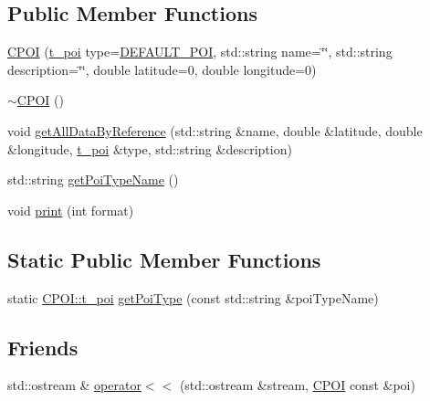 \subsection*{Public Member Functions}
\begin{DoxyCompactItemize}
\item 
\hyperlink{classCPOI_a9dd1c6e7b2a3e82ca3a383cc0a02bf8d}{C\+P\+OI} (\hyperlink{classCPOI_a4b95e2e14055d2f9ca134e474dd4a19f}{t\+\_\+poi} type=\hyperlink{classCPOI_a4b95e2e14055d2f9ca134e474dd4a19fa2c7961f7a81e01841006025f0653b0f0}{D\+E\+F\+A\+U\+L\+T\+\_\+\+P\+OI}, std\+::string name=\char`\"{}\char`\"{}, std\+::string description=\char`\"{}\char`\"{}, double latitude=0, double longitude=0)
\item 
\hyperlink{classCPOI_a8fc284c7b62be827e11f7e8ae443c55f}{$\sim$\+C\+P\+OI} ()
\item 
void \hyperlink{classCPOI_a65c0161ce80d49cf5f2fe80765bc94d9}{get\+All\+Data\+By\+Reference} (std\+::string \&name, double \&latitude, double \&longitude, \hyperlink{classCPOI_a4b95e2e14055d2f9ca134e474dd4a19f}{t\+\_\+poi} \&type, std\+::string \&description)
\item 
std\+::string \hyperlink{classCPOI_a908fcdd7b79aca230c67c05bf1b1a78c}{get\+Poi\+Type\+Name} ()
\item 
void \hyperlink{classCPOI_a2b65d12e722c89a8a105620726195d10}{print} (int format)
\end{DoxyCompactItemize}
\subsection*{Static Public Member Functions}
\begin{DoxyCompactItemize}
\item 
static \hyperlink{classCPOI_a4b95e2e14055d2f9ca134e474dd4a19f}{C\+P\+O\+I\+::t\+\_\+poi} \hyperlink{classCPOI_ac100f8c90fe0e5057e6fa4eca53126ad}{get\+Poi\+Type} (const std\+::string \&poi\+Type\+Name)
\end{DoxyCompactItemize}
\subsection*{Friends}
\begin{DoxyCompactItemize}
\item 
std\+::ostream \& \hyperlink{classCPOI_ad0c53792637fc266cb40d31e21c8a68f}{operator$<$$<$} (std\+::ostream \&stream, \hyperlink{classCPOI}{C\+P\+OI} const \&poi)
\end{DoxyCompactItemize}


